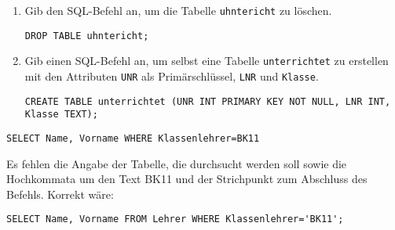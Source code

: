 \documentclass[a4paper,12pt, headsepline, ngerman]{scrartcl}
\begin{document}
	\begin{Answer}[ref=KA_SQL_A3]
		\begin{enumerate}[label=\alph*)]
			\item Gib den SQL-Befehl an, um die Tabelle \lstinline!uhntericht! zu löschen.
			
			\lstinline!DROP TABLE uhntericht;!
			\item Gib einen SQL-Befehl an, um selbst eine Tabelle \lstinline!unterrichtet! zu erstellen mit den Attributen \lstinline!UNR! als Primärschlüssel, \lstinline!LNR! und \lstinline!Klasse!.
			
			\lstinline!CREATE TABLE unterrichtet (UNR INT PRIMARY KEY NOT NULL, LNR INT, Klasse TEXT);!
		\end{enumerate}
	\end{Answer}%
	\begin{Answer}[ref=KA_SQL_A4]
		
		\lstinline!SELECT Name, Vorname WHERE Klassenlehrer=BK11!
		
		Es fehlen die Angabe der Tabelle, die durchsucht werden soll sowie die Hochkommata um den Text BK11 und der Strichpunkt zum Abschluss des Befehls. Korrekt wäre:
		
		\lstinline!SELECT Name, Vorname FROM Lehrer WHERE Klassenlehrer='BK11';!
	\end{Answer}%
\end{document}
